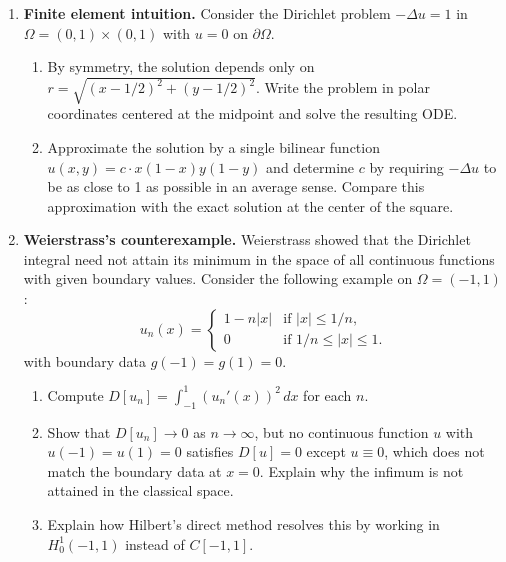 \begin{enumerate}
    \item \textbf{Finite element intuition.}
    Consider the Dirichlet problem $-\Delta u = 1$ in $\Omega = (0,1) \times (0,1)$ with $u = 0$ on $\partial\Omega$.
    \begin{enumerate}
        \item By symmetry, the solution depends only on $r = \sqrt{(x-1/2)^2 + (y-1/2)^2}$. Write the problem in polar coordinates centered at the midpoint and solve the resulting ODE.
        \item Approximate the solution by a single bilinear function $u(x,y) = c \cdot x(1-x)y(1-y)$ and determine $c$ by requiring $-\Delta u$ to be as close to 1 as possible in an average sense. Compare this approximation with the exact solution at the center of the square.
    \end{enumerate}

    \item[$\star$] \textbf{Weierstrass's counterexample.}
    Weierstrass showed that the Dirichlet integral need not attain its minimum in the space of all continuous functions with given boundary values. Consider the following example on $\Omega = (-1, 1)$:
    \[
        u_n(x) = \begin{cases} 1 - n|x| & \text{if } |x| \leq 1/n, \\ 0 & \text{if } 1/n \leq |x| \leq 1. \end{cases}
    \]
    with boundary data $g(-1) = g(1) = 0$.
    \begin{enumerate}
        \item Compute $D[u_n] = \int_{-1}^{1} (u_n'(x))^2 \, dx$ for each $n$.
        \item Show that $D[u_n] \to 0$ as $n \to \infty$, but no continuous function $u$ with $u(-1) = u(1) = 0$ satisfies $D[u] = 0$ except $u \equiv 0$, which does not match the boundary data at $x = 0$. Explain why the infimum is not attained in the classical space.
        \item Explain how Hilbert's direct method resolves this by working in $H^1_0(-1, 1)$ instead of $C[-1,1]$.
    \end{enumerate}

\end{enumerate}
